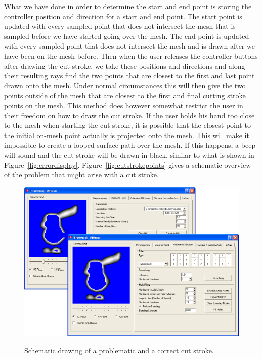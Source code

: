 What we have done in order to determine the start and end point is storing the controller position and direction for a start and end point. The start point is updated with every sampled point that does not intersect the mesh that is sampled before we have started going over the mesh. The end point is updated with every sampled point that does not intersect the mesh and is drawn after we have been on the mesh before. Then when the user releases the controller buttons after drawing the cut stroke, we take these positions and directions and along their resulting rays find the two points that are closest to the first and last point drawn onto the mesh. Under normal circumstances this will then give the two points outside of the mesh that are closest to the first and final cutting stroke points on the mesh. This method does however somewhat restrict the user in their freedom on how to draw the cut stroke. If the user holds his hand too close to the mesh when starting the cut stroke, it is possible that the closest point to the initial on-mesh point actually is projected onto the mesh. This will make it impossible to create a looped surface path over the mesh. If this happens, a beep will sound and the cut stroke will be drawn in black, similar to what is shown in Figure~\ref{fig:errordisplay}. Figure~\ref{fig:cutstrokepoints} gives a schematic overview of the problem that might arise with a cut stroke.



\begin{figure}[!h]
    \centering
    \includegraphics[width=0.7260\linewidth]{figures/voldiff_ui}\\
    \caption[Schematic drawing of a problematic cut stroke]{Schematic drawing of a problematic and a correct cut stroke.
      \label{fig:schematiccut}}
\end{figure}

